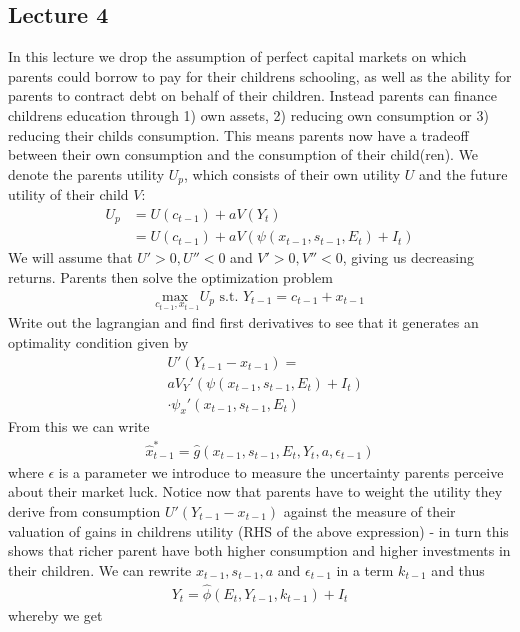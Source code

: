 \documentclass[12pt, a4paper]{article}
\begin{document}
\begin{multicols}{2}
\subsection{Lecture 4}
In this lecture we drop the assumption of perfect capital markets on which parents could borrow to pay for their childrens schooling, as well as the ability for parents to contract debt on behalf of their children. Instead parents can finance childrens education through 1) own assets, 2) reducing own consumption or 3) reducing their childs consumption. This means parents now have a tradeoff between their own consumption and the consumption of their child(ren). We denote the parents utility $U_p$, which consists of their own utility $U$ and the future utility of their child $V$:
\begin{align*}
U_p &= U(c_{t-1}) + aV(Y_t) \\
&= U(c_{t-1}) + aV(\psi(x_{t-1},s_{t-1},E_t) + I_t)
\end{align*}
We will assume that $U'>0, U''<0$ and $V'>0, V''<0$, giving us decreasing returns. Parents then solve the optimization problem
\begin{align*}
\underset{c_{t-1}, x_{t-1}}{\text{max }} U_p \text{ s.t. } Y_{t-1} = c_{t-1} + x_{t-1}
\end{align*}
Write out the lagrangian and find first derivatives to see that it generates an optimality condition given by
\begin{align*}
&U'(Y_{t-1} -x_{t-1}) =\\
&aV_{Y}'(\psi(x_{t-1},s_{t-1},E_t)+I_t) \\
& \cdot \psi_x'(x_{t-1},s_{t-1},E_t)
\end{align*}
From this we can write
\begin{align*}
\hat{x}_{t-1}^* = \hat{g}(x_{t-1},s_{t-1},E_t, Y_t, a, \epsilon_{t-1})
\end{align*}
where $\epsilon$ is a parameter we introduce to measure the uncertainty parents perceive about their market luck. Notice now that parents have to weight the utility they derive from consumption $U'(Y_{t-1} -x_{t-1})$ against the measure of their valuation of gains in childrens utility (RHS of the above expression) - in turn this shows that richer parent have both higher consumption and higher investments in their children. We can rewrite $x_{t-1},s_{t-1},a$ and $\epsilon_{t-1}$ in a term $k_{t-1}$ and thus
\begin{align*}
Y_t = \hat{\phi} (E_t, Y_{t-1}, k_{t-1})+I_t
\end{align*}
whereby we get

\end{multicols}
\end{document}
